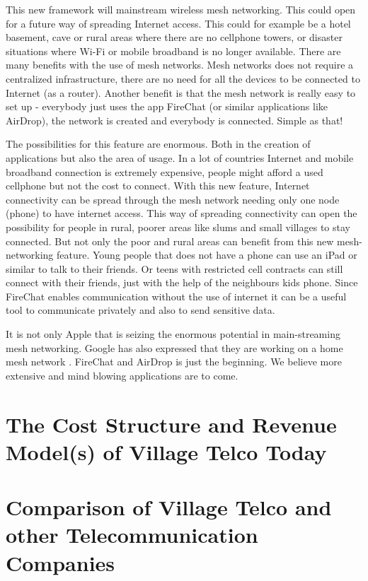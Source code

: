 This new framework will mainstream wireless mesh networking. This could open for a future way of spreading Internet access. This could for example be a hotel basement, cave or rural areas where there are no cellphone towers, or disaster situations where Wi-Fi or mobile broadband  is no longer available. There are many benefits with the use of mesh networks. Mesh networks does not require a centralized infrastructure, there are no need for all the devices to be connected to Internet (as a router). Another benefit is that the mesh network is really easy to set up - everybody just uses the app FireChat (or similar applications like AirDrop), the network is created and everybody is connected. Simple as that! 

The possibilities for this feature are enormous. Both in the creation of applications but also the area of usage. In a lot of countries Internet and mobile broadband connection is extremely expensive, people might afford a used cellphone but not the cost to connect. With this new feature, Internet connectivity can be spread through the mesh network needing only one node (phone) to have internet access. This way of spreading connectivity can open the possibility for people in rural, poorer areas like slums and small villages to stay connected. But not only the poor and rural areas can benefit from this new mesh-networking feature. Young people that does not have a phone can use an iPad or similar to talk to their friends. Or teens with restricted cell contracts can still connect with their friends, just with the help of the neighbours kids phone. Since FireChat enables communication without the use of internet it can be a useful tool to communicate privately and also to send sensitive data.
 
It is not only Apple that is seizing the enormous potential in main-streaming mesh networking. Google has also expressed that they are working on a home mesh network \cite{googleMesh}. FireChat and AirDrop is just the beginning. We believe more extensive and mind blowing applications are to come. 

\section{The Cost Structure and Revenue Model(s) of Village Telco Today}

\section{Comparison of Village Telco and other Telecommunication Companies}

